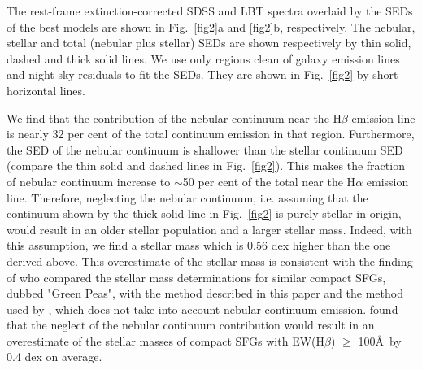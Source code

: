 \documentclass[useAMS,usenatbib]{mn2e}
\begin{document}
The rest-frame extinction-corrected SDSS and LBT spectra overlaid by the 
SEDs of the best models are shown in Fig.~\ref{fig2}a and \ref{fig2}b,
respectively. The nebular, stellar and total (nebular plus stellar) SEDs are 
shown respectively by thin solid, dashed and thick solid lines. 
We use only regions clean of galaxy
emission lines and night-sky residuals to fit the SEDs. They are shown in 
Fig.~\ref{fig2} by short horizontal lines.

We find 
that the contribution of the nebular continuum near the H$\beta$ emission line 
is nearly 32 per cent of the total continuum emission in that region. 
Furthermore, the SED of the nebular continuum is shallower than 
the stellar continuum SED (compare the thin solid and dashed lines in 
Fig.~\ref{fig2}).
This makes the fraction of nebular continuum
increase to $\sim$50 per cent of the total near the H$\alpha$ emission line.
Therefore, neglecting the nebular continuum, 
i.e. assuming that the continuum shown by the thick solid line in 
Fig.~\ref{fig2} is purely stellar in origin, would result in an older
stellar population and a larger stellar mass. Indeed, with this assumption, we
find a stellar mass which is 0.56 dex higher than the one derived above.
This overestimate of the stellar mass is consistent with the finding of \citet{I11} 
who compared the stellar mass determinations for similar compact SFGs, dubbed "Green Peas",
with the method described in this paper and the method used by \citet{Ca09},
which does not take into account nebular continuum emission. \citet{I11} found that 
the neglect of the nebular continuum contribution would result in an overestimate of the stellar masses of 
compact SFGs with EW(H$\beta$) $\geq$ 100\AA\ by 0.4 dex on average.
\end{document}
